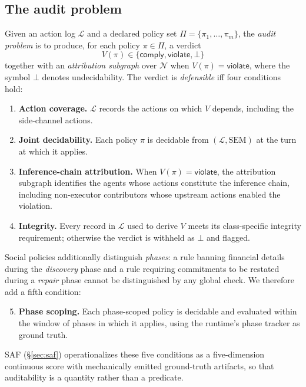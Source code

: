 \documentclass{article}
\begin{document}
\subsection{The audit problem}
\label{sec:problem:audit}

Given an action log $\mathcal{L}$ and a declared policy set $\Pi = \{\pi_1, \dots, \pi_m\}$, the \emph{audit problem} is to produce, for each policy $\pi \in \Pi$, a verdict
\[
  V(\pi) \in \{\textsf{comply}, \textsf{violate}, \bot\}
\]
together with an \emph{attribution subgraph} over $\mathcal{N}$ when $V(\pi) = \textsf{violate}$, where the symbol $\bot$ denotes undecidability. The verdict is \emph{defensible} iff four conditions hold:

\begin{enumerate}
  \item \textbf{Action coverage.} $\mathcal{L}$ records the actions on which $V$ depends, including the side-channel actions.
  \item \textbf{Joint decidability.} Each policy $\pi$ is decidable from $(\mathcal{L}, \mathrm{SEM})$ at the turn at which it applies.
  \item \textbf{Inference-chain attribution.} When $V(\pi) = \textsf{violate}$, the attribution subgraph identifies the agents whose actions constitute the inference chain, including non-executor contributors whose upstream actions enabled the violation.
  \item \textbf{Integrity.} Every record in $\mathcal{L}$ used to derive $V$ meets its class-specific integrity requirement; otherwise the verdict is withheld as $\bot$ and flagged.
\end{enumerate}

Social policies additionally distinguish \emph{phases}: a rule banning financial details during the \emph{discovery} phase and a rule requiring commitments to be restated during a \emph{repair} phase cannot be distinguished by any global check. We therefore add a fifth condition:

\begin{enumerate}
  \setcounter{enumi}{4}
  \item \textbf{Phase scoping.} Each phase-scoped policy is decidable and evaluated within the window of phases in which it applies, using the runtime's phase tracker as ground truth.
\end{enumerate}

SAF (\S\ref{sec:saf}) operationalizes these five conditions as a five-dimension continuous score with mechanically emitted ground-truth artifacts, so that auditability is a quantity rather than a predicate.
\end{document}
